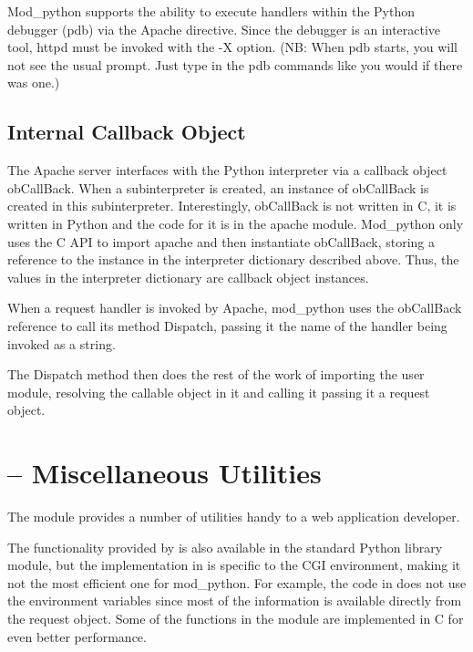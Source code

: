 Mod_python supports the ability to execute handlers within the Python
debugger (pdb) via the  Apache directive. Since
the debugger is an interactive tool, httpd must be invoked with the -X
option. (NB: When pdb starts, you will not see the usual \code{>>>}
prompt. Just type in the pdb commands like you would if there was
one.)

\subsection{Internal Callback Object\label{pyapi-callback}}

The Apache server interfaces with the Python interpreter via a
callback object obCallBack. When a subinterpreter is created, an
instance of obCallBack is created in this
subinterpreter. Interestingly, obCallBack is not written in C, it is
written in Python and the code for it is in the apache module.
Mod_python only uses the C API to import apache and then instantiate
obCallBack, storing a reference to the instance in the interpreter
dictionary described above. Thus, the values in the interpreter
dictionary are callback object instances.

When a request handler is invoked by Apache, mod_python uses the
obCallBack reference to call its method Dispatch, passing it the name
of the handler being invoked as a string.
            
The Dispatch method then does the rest of the work of importing the
user module, resolving the callable object in it and calling it
passing it a request object.

\section{ -- Miscellaneous Utilities\label{pyapi-util}}

The  module provides a number of utilities handy to a 
web application developer. 

The functionality provided by  is also available in the
standard Python library  module, but the
implementation in  is specific to the CGI environment,
making it not the most efficient one for mod_python. For example, the
code in  does not use the environment variables since
most of the information is available directly from the
request object. Some of the functions in the 
module are implemented in C for even better performance.

